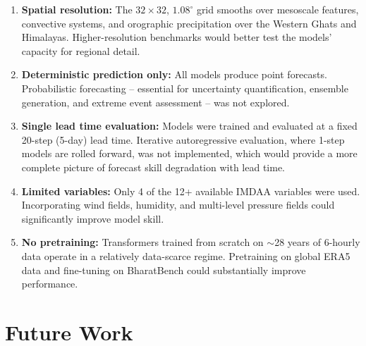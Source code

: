 \documentclass[12pt,a4paper,oneside]{report}
\begin{document}
\begin{enumerate}
    \item \textbf{Spatial resolution:} The $32\times32$, $1.08^\circ$ grid smooths over mesoscale features, convective systems, and orographic precipitation over the Western Ghats and Himalayas. Higher-resolution benchmarks would better test the models' capacity for regional detail.
    
    \item \textbf{Deterministic prediction only:} All models produce point forecasts. Probabilistic forecasting -- essential for uncertainty quantification, ensemble generation, and extreme event assessment -- was not explored.
    
    \item \textbf{Single lead time evaluation:} Models were trained and evaluated at a fixed 20-step (5-day) lead time. Iterative autoregressive evaluation, where 1-step models are rolled forward, was not implemented, which would provide a more complete picture of forecast skill degradation with lead time.
    
    \item \textbf{Limited variables:} Only 4 of the 12+ available IMDAA variables were used. Incorporating wind fields, humidity, and multi-level pressure fields could significantly improve model skill.
    
    \item \textbf{No pretraining:} Transformers trained from scratch on $\sim$28 years of 6-hourly data operate in a relatively data-scarce regime. Pretraining on global ERA5 data and fine-tuning on BharatBench could substantially improve performance.
\end{enumerate}

\section{Future Work}
\end{document}
